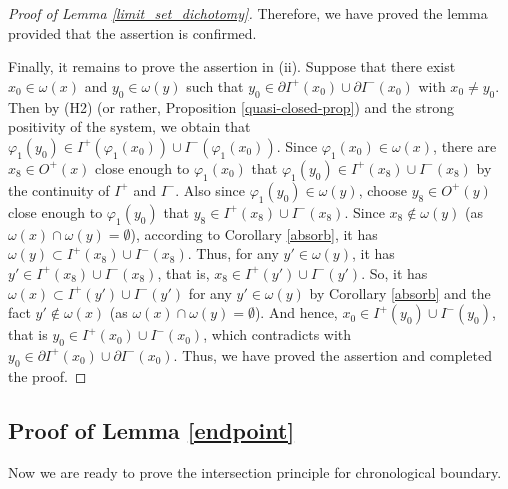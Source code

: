 \documentclass[a4paper,11pt]{article}
\theoremstyle{plain}
\theoremstyle{definition}
\numberwithin{equation}{section}
\begin{document}
\begin{proof}[Proof of Lemma \ref{limit_set_dichotomy}]
    Therefore, we have proved the lemma provided that the assertion is confirmed.
		
	Finally, it remains to prove the assertion in (ii). Suppose that there exist $x_{0}\in\omega(x)$ and $y_{0}\in\omega(y)$ such that $y_{0}\in \partial I^{+}(x_{0})\cup \partial I^{-}(x_{0})$ with $x_0\neq y_0$. 
    Then by (H2) (or rather, Proposition \ref{quasi-closed-prop}) and the strong positivity of the system, we obtain that $\varphi_1(y_{0})\in I^{+}(\varphi_1(x_{0}))\cup I^{-}(\varphi_1(x_{0}))$. Since $\varphi_1(x_{0})\in \omega(x)$, there are $x_8\in O^+(x)$ close enough to $\varphi_1(x_{0})$ that $\varphi_1(y_{0})\in I^{+}(x_8)\cup I^{-}(x_8)$ by the continuity of $I^{+}$ and $I^{-}$. 
    Also since $\varphi_1(y_{0})\in \omega(y)$, choose $y_8\in O^+(y)$ close enough to $\varphi_1(y_{0})$ that $y_8\in I^{+}(x_8)\cup I^{-}(x_8)$. Since $x_8\notin \omega(y)$ (as $\omega(x)\cap\omega(y)=\emptyset$), according to Corollary \ref{absorb}, it has $\omega(y)\subset I^{+}(x_8)\cup I^{-}(x_8)$. 
    Thus, for any $y'\in \omega(y)$, it has  $y'\in I^{+}(x_8)\cup I^{-}(x_8)$, that is, $x_8\in I^{+}(y')\cup I^{-}(y')$. 
    So, it has $\omega(x)\subset I^{+}(y')\cup I^{-}(y')$ for any $y'\in \omega(y)$ by Corollary \ref{absorb} and the fact $y'\notin\omega(x)$ (as $\omega(x)\cap\omega(y)=\emptyset$). And hence, $x_0\in I^{+}(y_0)\cup I^{-}(y_0)$, that is $y_0\in I^{+}(x_0)\cup I^{-}(x_0)$, which contradicts with $y_{0}\in\partial I^{+}(x_{0})\cup \partial I^{-}(x_{0})$. Thus, we have proved the assertion and completed the proof.
\end{proof}

    \subsection{Proof of Lemma \ref{endpoint}}\label{s3.4}
	Now we are ready to prove the intersection principle for chronological boundary.
	
\end{document}
